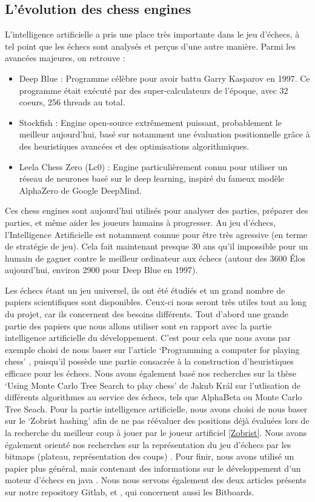 \documentclass{article}
\begin{document}
\subsection{L’évolution des chess engines}
L’intelligence artificielle a pris une place très importante dans le jeu d'échecs, à tel point que les échecs
sont analysés et perçus d'une autre manière. Parmi les avancées majeures, on retrouve :
\begin{itemize}
    \item Deep Blue : Programme célèbre pour avoir battu Garry Kasparov en 1997. Ce programme était exécuté par des super-calculateurs
    de l'époque, avec 32 coeurs, 256 threads au total.
    \item Stockfish : Engine open-source extrêmement puissant, probablement le meilleur aujourd'hui, basé sur notamment une évaluation positionnelle
    grâce à des heuristiques avancées et des optimisations algorithmiques.
    \item Leela Chess Zero (Lc0) : Engine particulièrement connu pour utiliser un réseau de neurones basé sur le deep learning, inspiré du fameux
    modèle AlphaZero de Google DeepMind.
\end{itemize}
Ces chess engines sont aujourd’hui utilisés pour analyser des parties, préparer des parties, et même aider les
joueurs humains à progresser. Au jeu d'échecs, l'Intelligence Artificielle est notamment connue pour être très agressive
(en terme de stratégie de jeu). Cela fait maintenant presque 30 ans qu'il impossible pour un humain de gagner contre
le meilleur ordinateur aux échecs (autour des 3600 Élos aujourd'hui, environ 2900 pour Deep Blue en 1997).

Les échecs étant un jeu universel, ils ont été étudiés et un grand nombre de papiers scientifiques
sont disponibles. Ceux-ci nous seront très utiles tout au long du projet, car ils concernent des
besoins différents. Tout d'abord une grande partie des papiers que nous allons utiliser sont en rapport
avec la partie intelligence artificielle du développement. C'est pour cela que nous avons par exemple
choisi de nous baser sur l'article `Programming a computer for playing chess' \cite{Shannon1950}, 
puisqu'il possède une partie consacrée à la construction d'heuristiques efficace pour les échecs.
Nous avons également basé nos recherches sur la thèse `Using Monte Carlo Tree Search to play chess' \cite{Kral2021}
de Jakub Král sur l'utlisation de différents algorithmes au service des échecs, tels que AlphaBeta ou
Monte Carlo Tree Seach. Pour la partie intelligence artificielle, nous avons choisi de nous baser sur le 
`Zobrist hashing' \cite{ZobristHashing} afin de ne pas réévaluer des positions déjà évaluées lors de la 
recherche du meilleur coup à jouer par le joueur artificiel \ref{Zobrist}. Nous avons également orienté
nos recherches sur la représentation du jeu d'échecs par les bitmaps (plateau, représentation des coups) \cite{Bijl2021}.
Pour finir, nous avons utilisé un papier plus général, mais contenant des informations sur le développement
d'un moteur d'échecs en java \cite{PaulDailly}. Nous nous servons également des deux articles présents sur 
notre repository Gitlab, \cite{Bitboards} et \cite{GameBitboards}, qui concernent aussi les Bitboards.
\end{document}
